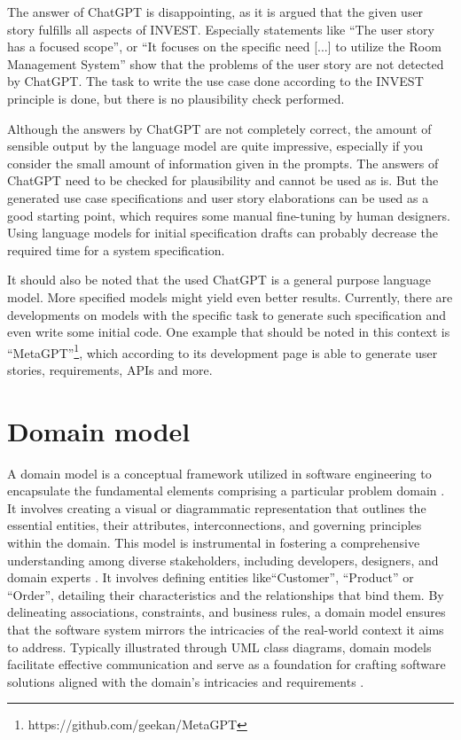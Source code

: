 \documentclass[conference,onecolumn]{IEEEtran}
\begin{document}
The answer of ChatGPT is disappointing, as it is argued that the given user story fulfills all aspects of INVEST. Especially statements like ``The user story has a focused scope'', or ``It focuses on the specific need [...] to utilize the Room Management System'' show that the problems of the user story are not detected by ChatGPT. The task to write the use case done according to the INVEST principle is done, but there is no plausibility check performed.

Although the answers by ChatGPT are not completely correct, the amount of sensible output by the language model are quite impressive, especially if you consider the small amount of information given in the prompts.
The answers of ChatGPT need to be checked for plausibility and cannot be used as is. But the generated use case specifications and user story elaborations can be used as a good starting point, which requires some manual fine-tuning by human designers. Using language models for initial specification drafts can probably decrease the required time for a system specification.

It should also be noted that the used ChatGPT is a general purpose language model. More specified models might yield even better results.
Currently, there are developments on models with the specific task to generate such specification and even write some initial code. One example that should be noted in this context is ``MetaGPT''\footnote{https://github.com/geekan/MetaGPT}, which according to its development page is able to generate user stories, requirements, APIs and more.




\section{Domain model}
A domain model is a conceptual framework utilized in software engineering to encapsulate the fundamental elements comprising a particular problem domain \cite{larman2012applying}. It involves creating a visual or diagrammatic representation that outlines the essential entities, their attributes, interconnections, and governing principles within the domain. This model is instrumental in fostering a comprehensive understanding among diverse stakeholders, including developers, designers, and domain experts \cite{fowler2004uml}. It involves defining entities like``Customer'', ``Product'' or ``Order'', detailing their characteristics and the relationships that bind them. By delineating associations, constraints, and business rules, a domain model ensures that the software system mirrors the intricacies of the real-world context it aims to address. Typically illustrated through UML class diagrams, domain models facilitate effective communication and serve as a foundation for crafting software solutions aligned with the domain's intricacies and requirements \cite{booch1994oo}.
\end{document}
